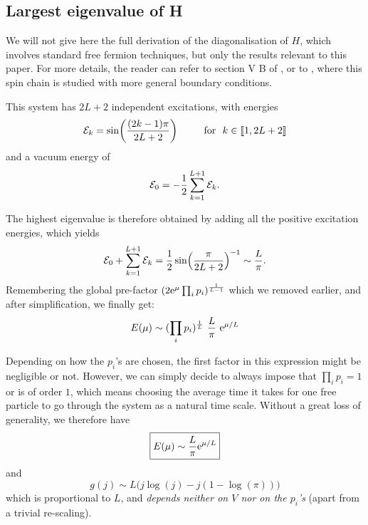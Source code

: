 \documentclass[aps,pre,onecolumn,showpacs,showkeys,a4paper]{revtex4-1}
\begin{document}
\subsection{Largest eigenvalue of H}
\label{IIIb}

We will not give here the full derivation of the diagonalisation of $H$, which involves standard free fermion techniques, but only the results relevant to this paper. For more details, the reader can refer to section V B of \cite{Lazarescu2015}, or to \cite{Bilstein1999}, where this spin chain is studied with more general boundary conditions.

This system has $2L+2$ independent excitations, with energies 
\begin{equation}
{\cal E}_k=\sin\biggl(\frac{(2k-1)\pi}{2L+2}\biggr)~~~~~~~~{\rm for}~~ k\in\llbracket1,2L+2\rrbracket
\end{equation}
and a vacuum energy of 
\begin{equation}
{\cal E}_0=-\frac{1}{2}\sum\limits_{k=1}^{L+1}{\cal E}_k.
\end{equation}

The highest eigenvalue is therefore obtained by adding all the positive excitation energies, which yields
\begin{equation}
{\cal E}_0+\sum\limits_{k=1}^{L+1}{\cal E}_k=\frac{1}{2}\sin\Bigl(\frac{\pi}{2L+2}\Bigr)^{-1}\sim \frac{L}{\pi}.
\end{equation}
Remembering the global pre-factor $(2{\rm e}^{\mu}\prod_i p_i )^{\frac{1}{L-1}}$ which we removed earlier, and after simplification, we finally get:
\begin{equation}
E(\mu)\sim(\prod_i p_i )^{\frac{1}{L}}~\frac{L}{\pi}~{\rm e}^{\mu/L}
\end{equation}

Depending on how the $p_i$'s are chosen, the first factor in this expression might be negligible or not. However, we can simply decide to always impose that $\prod_i p_i =1$ or is of order $1$, which means choosing the average time it takes for one free particle to go through the system as a natural time scale. Without a great loss of generality, we therefore have
\begin{equation}\boxed{
E(\mu)\sim\frac{L}{\pi}{\rm e}^{\mu/L}
}\end{equation}
and
\begin{equation}\label{IV-3-gMMC}\boxed{\boxed{
g(j)\sim L\bigl( j\log(j)-j(1-\log(\pi))\bigl)
}}\end{equation}
which is proportional to $L$, and {\it depends neither on $V$ nor on the $p_i$'s} (apart from a trivial re-scaling).
\end{document}
